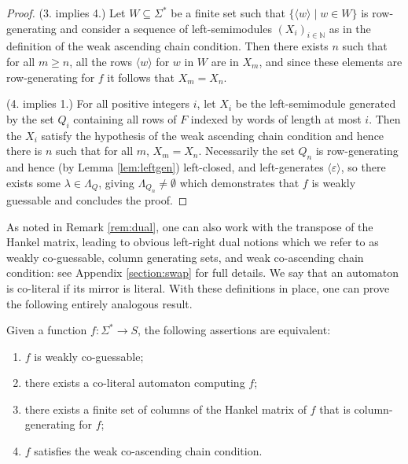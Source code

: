 \documentclass{lmcs}
\numberwithin{theorem}{section}
\begin{document}
\begin{proof}
(3. implies 4.) Let $W \subseteq \Sigma^*$ be a finite set such that $\{\langle w \rangle \mid w \in W\}$ is row-generating and consider a sequence of left-semimodules $(X_i)_{i \in \mathbb{N}}$ as in the definition of the weak ascending chain condition. Then there exists $n$ such that for all $m \geq n$, all the rows $\langle w \rangle$ for $w$ in $W$ are in $X_m$, and since these elements are row-generating for $f$ it follows that $X_m = X_n$.
	
	
(4. implies 1.) For all positive integers $i$, let $X_i$ be the left-semimodule generated by the set $Q_i$ containing all rows of $F$ indexed by words of length at most $i$. Then the $X_i$ satisfy the hypothesis of the weak ascending chain condition and hence there is $n$ such that for all $m$, $X_m = X_n$. Necessarily the set $Q_n$ is row-generating and hence (by Lemma \ref{lem:leftgen}) left-closed, and left-generates $\langle \varepsilon \rangle$, so there exists some $\lambda \in \Lambda_Q$, giving $\Lambda_{Q_n} \neq \emptyset$ which demonstrates that $f$ is weakly guessable and concludes the proof.
\end{proof}

\begin{rem}
\label{rem:dual2}
As noted in Remark \ref{rem:dual}, one can also work with the transpose of the Hankel matrix, leading to obvious left-right dual notions which we refer to as weakly co-guessable, column generating sets, and weak co-ascending chain condition: see Appendix \ref{section:swap} for full details. We say that an automaton is co-literal if its mirror is literal. With these definitions in place, one can prove the following entirely analogous result.
\end{rem}

\begin{thm}
	\label{prop:coweakly}
	Given a function $f:\Sigma^* \to S$, the following assertions are equivalent:
	\begin{enumerate}
		\item $f$ is weakly co-guessable;
		\item there exists a co-literal automaton computing $f$;
		\item there exists a finite set of columns of the Hankel matrix of $f$ that is column-generating for $f$;
		\item $f$ satisfies the weak co-ascending chain condition.
	\end{enumerate}  
\end{thm}
\end{document}
